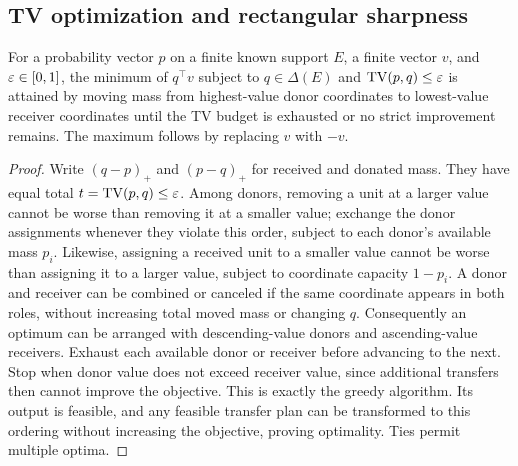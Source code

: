 \subsection{TV optimization and rectangular sharpness}
\begin{lemma}\label{lem:tv}
For a probability vector $p$ on a finite known support $E$, a finite vector $v$, and $\varepsilon\in[0,1]$, the minimum of $q^\top v$ subject to $q\in\Delta(E)$ and $\operatorname{TV}(p,q)\leq\varepsilon$ is attained by moving mass from highest-value donor coordinates to lowest-value receiver coordinates until the TV budget is exhausted or no strict improvement remains. The maximum follows by replacing $v$ with $-v$.
\end{lemma}
\begin{proof}
Write $(q-p)_+$ and $(p-q)_+$ for received and donated mass. They have equal total $t=\operatorname{TV}(p,q)\leq\varepsilon$. Among donors, removing a unit at a larger value cannot be worse than removing it at a smaller value; exchange the donor assignments whenever they violate this order, subject to each donor's available mass $p_i$. Likewise, assigning a received unit to a smaller value cannot be worse than assigning it to a larger value, subject to coordinate capacity $1-p_i$. A donor and receiver can be combined or canceled if the same coordinate appears in both roles, without increasing total moved mass or changing $q$. Consequently an optimum can be arranged with descending-value donors and ascending-value receivers. Exhaust each available donor or receiver before advancing to the next. Stop when donor value does not exceed receiver value, since additional transfers then cannot improve the objective. This is exactly the greedy algorithm. Its output is feasible, and any feasible transfer plan can be transformed to this ordering without increasing the objective, proving optimality. Ties permit multiple optima.
\end{proof}

